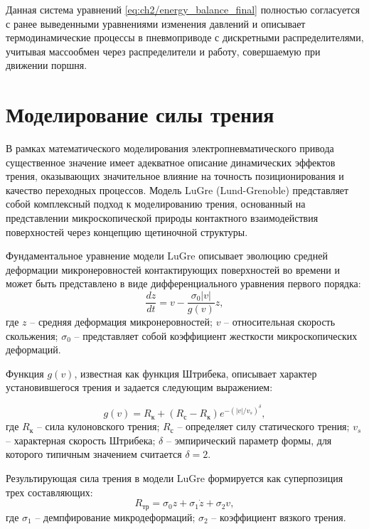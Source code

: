 Данная система уравнений \eqref{eq:ch2/energy_balance_final} полностью согласуется с ранее выведенными
уравнениями изменения давлений и описывает термодинамические процессы в пневмоприводе
с дискретными распределителями, учитывая массообмен через распределители и работу, совершаемую при движении поршня.

\section{Моделирование силы трения}\label{sec:ch2/sec2/subsec4}
В рамках математического моделирования электропневматического привода существенное значение имеет адекватное описание динамических эффектов трения,
оказывающих значительное влияние на точность позиционирования и качество переходных процессов.
Модель LuGre (Lund-Grenoble) представляет собой комплексный подход к моделированию трения,
основанный на представлении микроскопической природы контактного
взаимодействия поверхностей через концепцию щетиночной структуры.

Фундаментальное уравнение модели LuGre описывает эволюцию средней деформации
микронеровностей контактирующих поверхностей во времени и может быть представлено в виде дифференциального уравнения первого порядка:
\begin{equation}
\label{eq:ch2/lugre}
\frac{dz}{dt} = v - \frac{\sigma_0|v|}{g(v)}z,
\end{equation}
где $z$ -- средняя деформация микронеровностей;
$v$ -- относительная скорость скольжения;
$\sigma_0$ -- представляет собой коэффициент жесткости микроскопических деформаций.

Функция $g(v)$, известная как функция Штрибека, описывает характер установившегося трения и задается следующим выражением:

\begin{equation}
\label{eq:ch2/stiction_function}
g(v) = R_\text{к} + (R_\text{с} - R_\text{к})e^{-(|v|/v_s)^\delta},
\end{equation}
где $R_\text{к}$ -- сила кулоновского трения;
$R_\text{с}$ -- определяет силу статического трения;
$v_s$ -- характерная скорость Штрибека;
$\delta$ -- эмпирический параметр формы, для которого типичным значением считается $\delta = 2$.

Результирующая сила трения в модели LuGre формируется как суперпозиция трех составляющих:
\begin{equation}
\label{eq:ch2/friction_force}
R_\text{тр} = \sigma_0z + \sigma_1\dot{z} + \sigma_2v,
\end{equation}
где $\sigma_1$ -- демпфирование микродеформаций;
$\sigma_2$ -- коэффициент вязкого трения.

